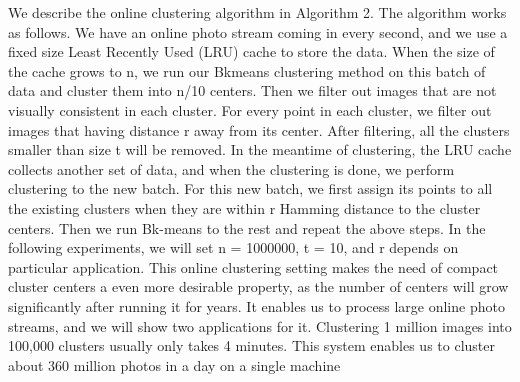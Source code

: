\documentclass[10pt,twocolumn,letterpaper]{article}
\begin{document}
We describe the online clustering algorithm in Algorithm
2. The algorithm works as follows. We have an online
photo stream coming in every second, and we use a fixed
size Least Recently Used (LRU) cache to store the data.
When the size of the cache grows to n, we run our Bkmeans
clustering method on this batch of data and cluster
them into n/10 centers. Then we filter out images that
are not visually consistent in each cluster. For every point
in each cluster, we filter out images that having distance r
away from its center. After filtering, all the clusters smaller
than size t will be removed. In the meantime of clustering,
the LRU cache collects another set of data, and when the
clustering is done, we perform clustering to the new batch.
For this new batch, we first assign its points to all the existing
clusters when they are within r Hamming distance to
the cluster centers. Then we run Bk-means to the rest and
repeat the above steps. In the following experiments, we
will set n = 1000000, t = 10, and r depends on particular
application. This online clustering setting makes the need
of compact cluster centers a even more desirable property,
as the number of centers will grow significantly after running
it for years. It enables us to process large online photo
streams, and we will show two applications for it. Clustering
1 million images into 100,000 clusters usually only
takes 4 minutes. This system enables us to cluster about
360 million photos in a day on a single machine
{\small


}
\end{document}
